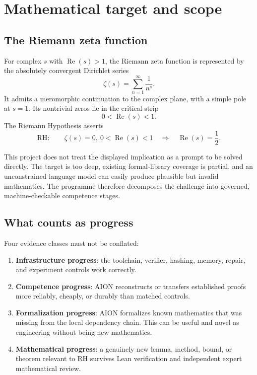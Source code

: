\documentclass[11pt,a4paper]{article}
\newcommand{\RH}{\mathrm{RH}}
\newcommand{\RePart}{\operatorname{Re}}
\begin{document}
\section{Mathematical target and scope}

\subsection{The Riemann zeta function}

For complex $s$ with $\RePart(s)>1$, the Riemann zeta function is represented by
the absolutely convergent Dirichlet series
\[
  \zeta(s)=\sum_{n=1}^{\infty}\frac{1}{n^s}.
\]
It admits a meromorphic continuation to the complex plane, with a simple pole
at $s=1$. Its nontrivial zeros lie in the critical strip
\[
  0 < \RePart(s) < 1.
\]
The Riemann Hypothesis asserts
\[
  \RH:\qquad \zeta(s)=0,\ 0<\RePart(s)<1
  \quad\Longrightarrow\quad
  \RePart(s)=\frac12.
\]

This project does not treat the displayed implication as a prompt to be solved
directly. The target is too deep, existing formal-library coverage is partial,
and an unconstrained language model can easily produce plausible but invalid
mathematics. The programme therefore decomposes the challenge into governed,
machine-checkable competence stages.

\subsection{What counts as progress}

Four evidence classes must not be conflated:

\begin{enumerate}
  \item \textbf{Infrastructure progress}: the toolchain, verifier, hashing,
  memory, repair, and experiment controls work correctly.
  \item \textbf{Competence progress}: AION reconstructs or transfers established
  proofs more reliably, cheaply, or durably than matched controls.
  \item \textbf{Formalization progress}: AION formalizes known mathematics that
  was missing from the local dependency chain. This can be useful and novel as
  engineering without being new mathematics.
  \item \textbf{Mathematical progress}: a genuinely new lemma, method, bound, or
  theorem relevant to RH survives Lean verification and independent expert
  mathematical review.
\end{enumerate}
\end{document}

